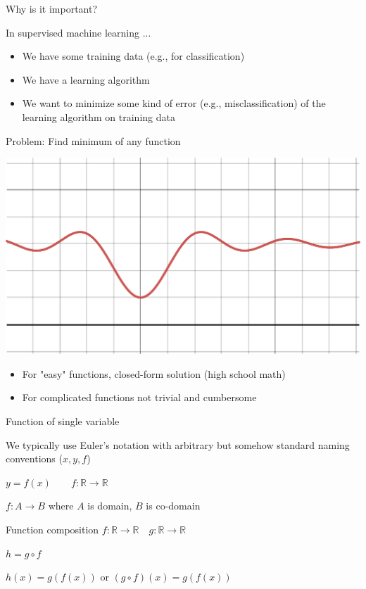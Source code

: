 \documentclass[12pt,aspectratio=169,handout]{beamer}
\begin{document}
\begin{frame}{Why is it important?}

In supervised machine learning ...
	
\pause

	\begin{itemize}
		\item We have some training data (e.g., for classification)
		\item We have a learning algorithm
		\item We want to minimize some kind of error (e.g., misclassification) of the learning algorithm on training data
	\end{itemize}
	
\end{frame}


\begin{frame}{Problem: Find minimum of any function}
	
	\includegraphics[width=0.7\linewidth]{img/desmos-graph1.pdf}
	
	\begin{itemize}
		\item For "easy" functions, closed-form solution (high school math)
		\item For complicated functions not trivial and cumbersome
	\end{itemize}
	
	
	
\end{frame}







\begin{frame}{Function of single variable}
	
	We typically use Euler's notation with arbitrary but somehow standard naming conventions ($x, y, f$)
	
	$y = f (x) \qquad f: \mathbb{R} \to \mathbb{R}$
	
	$f : A \to B$ where $A$ is domain, $B$ is co-domain
	
	\bigskip
	
	\begin{block}{Function composition}
		$f: \mathbb{R} \to \mathbb{R} \quad g: \mathbb{R} \to \mathbb{R}$
		
		$h = g \circ f$
		
		$h(x) = g(f(x))$ or $(g \circ f)(x)= g(f(x))$
	\end{block}
	
\end{frame}
\end{document}
